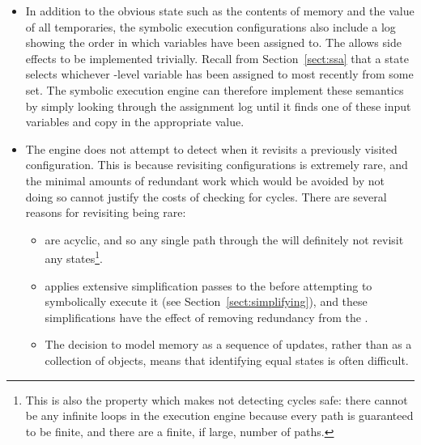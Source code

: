 \begin{itemize}

\item In addition to the obvious state such as the contents of memory
  and the value of all {\StateMachine} temporaries, the symbolic
  execution configurations also include a log showing the order in
  which variables have been assigned to.
  The allows \state{$\Phi$} side effects to be implemented trivially.
  Recall from Section~\ref{sect:ssa} that a {\technique}
  \state{$\Phi$} state selects whichever {\StateMachine}-level
  variable has been assigned to most recently from some set.  The
  symbolic execution engine can therefore implement these semantics by
  simply looking through the assignment log until it finds one of
  these input variables and copy in the appropriate value.


\item {} The engine
  does not attempt to detect when it revisits a previously visited
  configuration.  This is because revisiting configurations is
  extremely rare, and the minimal amounts of redundant work which
  would be avoided by not doing so cannot justify the costs of
  checking for cycles.  There are several reasons for revisiting being
  rare:

  \begin{itemize}
  \item {\STateMachines} are acyclic, and so any single path through
    the {\StateMachine} will definitely not revisit any
    states\footnote{This is also the property which makes not
      detecting cycles safe: there cannot be any infinite loops in the
      execution engine because every path is guaranteed to be finite,
      and there are a finite, if large, number of paths.}.
  \item {\Technique} applies extensive simplification passes to the
    {\StateMachine} before attempting to symbolically execute it (see
    Section~\ref{sect:simplifying}), and these simplifications have
    the effect of removing redundancy from the {\StateMachines}.
  \item The decision to model memory as a sequence of updates, rather
    than as a collection of objects, means that identifying equal
    states is often difficult.  
  \end{itemize}
\end{itemize}

